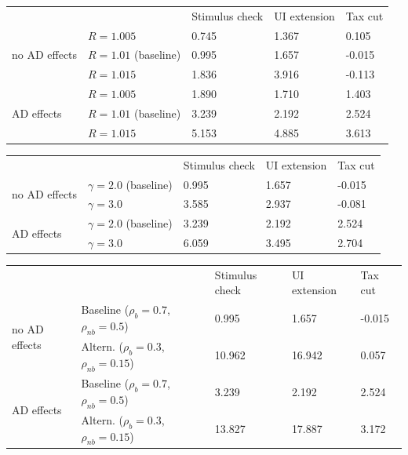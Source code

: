 
\begin{tabular}{@{}lllll@{}}
\toprule
                  &                & Stimulus check & UI extension & Tax cut \\ \cmidrule(l){1-5}
    \multirow{3}{*}{no AD effects} & $R = 1.005$ & 0.745 & 1.367 & 0.105 \\
                       & $R = 1.01$ (baseline) & 0.995 & 1.657 & -0.015 \\
                       & $R = 1.015$ & 1.836 & 3.916 & -0.113 \\ \cmidrule(l){1-5}
    \multirow{3}{*}{AD effects} & $R = 1.005$ & 1.890 & 1.710 & 1.403 \\
                       & $R = 1.01$ (baseline) & 3.239 & 2.192 & 2.524 \\
                       & $R = 1.015$ & 5.153 & 4.885 & 3.613 \\ \cmidrule(l){1-5}
\end{tabular}

\begin{tabular}{@{}lllll@{}}
\toprule
                  &                & Stimulus check & UI extension & Tax cut \\ \cmidrule(l){1-5}
    \multirow{2}{*}{no AD effects} & $\gamma = 2.0$ (baseline) & 0.995 & 1.657 & -0.015 \\
                       & $\gamma = 3.0$ & 3.585 & 2.937 & -0.081 \\ \cmidrule(l){1-5}
    \multirow{2}{*}{AD effects} & $\gamma = 2.0$ (baseline) & 3.239 & 2.192 & 2.524 \\
                       & $\gamma = 3.0$ & 6.059 & 3.495 & 2.704 \\ \cmidrule(l){1-5}
\end{tabular}

\begin{tabular}{@{}lllll@{}}
\toprule
                  &                & Stimulus check & UI extension & Tax cut \\ \cmidrule(l){1-5}
    \multirow{2}{*}{no AD effects} & Baseline ($\rho_b = 0.7$, $\rho_{nb} = 0.5$) & 0.995 & 1.657 & -0.015 \\
                       & Altern. ($\rho_b = 0.3$, $\rho_{nb} = 0.15$) & 10.962 & 16.942 & 0.057 \\ \cmidrule(l){1-5}
    \multirow{2}{*}{AD effects} & Baseline ($\rho_b = 0.7$, $\rho_{nb} = 0.5$) & 3.239 & 2.192 & 2.524 \\
                       & Altern. ($\rho_b = 0.3$, $\rho_{nb} = 0.15$) & 13.827 & 17.887 & 3.172 \\ \cmidrule(l){1-5}
\end{tabular}

